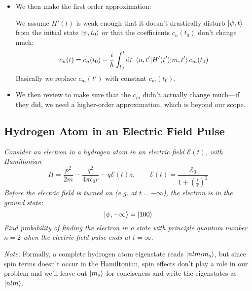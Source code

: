 \documentclass[11pt, a4paper]{article}
\newcommand{\diff}{\mathop{}\!\mathrm{d}} %
\newcommand{\Ham}{Hamiltonian\xspace}
\newcommand{\p}{\psi}  %
\newcommand{\E}{\mathcal{E}}  %
\begin{document}
\begin{itemize}
	\item We then make the first order approximation:
	
	We assume $ H'(t) $ is weak enough that it doesn't drastically disturb $ \ket{\p, t} $ from the initial state $ \ket{\p, t_{0}} $ or that the coefficients $ c_{n}(t_{0}) $ don't change much:
	\begin{equation*}
		c_{n}(t) = c_{n}(t_{0}) - \frac{i}{\hbar}\int_{t_{0}}^{t}\diff t\ \mel{n, t'}{H'(t')}{m, t'}c_{m}(t_{0})
	\end{equation*}
	Basically we replace $ c_{m}(t') $ with constant $ c_{m}(t_{0}) $.
	
	\item We then review to make sure that the $ c_{m} $ didn't actually change much---if they did, we need a higher-order approximation, which is beyond our scope.
	
\end{itemize}

\subsection{Hydrogen Atom in an Electric Field Pulse}
\textit{Consider an electron in a hydrogen atom in an electric field $ \E(t) $, with \Ham}
\begin{equation*}
	H = \frac{p^{2}}{2m} - \frac{q^{2}}{4 \pi \epsilon_{0} r} - q \E(t)z, \qquad \E(t) = \frac{\E_{0}}{1 + \left(\frac{t}{\tau}\right)^{2}}
\end{equation*}
\textit{Before the electric field is turned on (e.g. at $ t = - \infty $), the electron is in the ground state:}
\begin{equation*}
	\ket{\p, - \infty} = \ket{100}
\end{equation*}
\textit{Find probability of finding the electron in a state with principle quantum number $ n = 2 $ when the electric field pulse ends at $ t = \infty $}.

\textit{Note:} Formally, a complete hydrogen atom eigenstate reads $ \ket{nlm_{l}m_{s}} $, but since spin terms doesn't occur in the \Ham, spin effects don't play a role in our problem and we'll leave out $ \ket{m_{s}} $ for conciseness and write the eigenstates as $ \ket{nlm} $.
	
\end{document}
